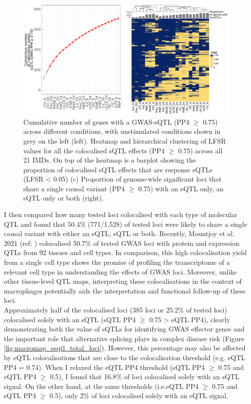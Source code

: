\begin{figure}[H]
  \centering
  \includegraphics[width=\textwidth]{coloc_cum_response_sqtl}
  \caption[Condition-specificity of colocalised sQTLs]{Cumulative number of genes with a GWAS-sQTL (PP4 $\geq$ 0.75) across different conditions, with unstimulated conditions shown in grey on the left (left). Heatmap and hierarchical clustering of LFSR values for all the colocalised sQTL effects (PP4 $\geq$ 0.75) across all 21 IMDs. On top of the heatmap is a barplot showing the proportion of colocalised sQTL effects that are response sQTLs (LFSR < 0.05) (c) Proportion of genome-wide significant loci that share a single causal variant (PP4 $\geq$ 0.75) with an eQTL only, an sQTL only or both (right).}
  \label{fig:coloc_cum_response_sqtl}   
\end{figure}
I then compared how many tested loci colocalised with each type of molecular QTL and found that 50.4\% (771/1,528) of tested loci were likely to share a single causal variant with either an eQTL, sQTL or both. Recently, Mountjoy et al. 2021 (ref: \cite{Mountjoy2021-fc}) colocalised 50.7\% of tested GWAS loci with protein and expression QTLs from 92 tissues and cell types. In comparison, this high colocalisation yield from a single cell type shows the promise of profiling the transcriptome of a relevant cell type in understanding the effects of GWAS loci. Moreover, unlike other tissue-level QTL maps, interpreting these colocalisations in the context of macrophages potentially aids the interpretation and functional follow-up of these loci. \\

Approximately half of the colocalised loci (385 loci or 25.2\% of tested loci) colocalised solely with an sQTL (sQTL PP4 $\geq$ 0.75 > eQTL PP4), clearly demonstrating both the value of sQTLs for identifying GWAS effector genes and the important role that alternative splicing plays in complex disease risk (Figure \ref{fig:macromap_esqtl_total_loci}). However, this percentage may also be affected by eQTL colocalisations that are close to the colocalisation threshold (e.g. eQTL PP4 = 0.74). When I relaxed the eQTL PP4 threshold (sQTL PP4 $\geq$ 0.75 and eQTL PP4 $\geq$ 0.5), I found that 16.8\% of loci colocalised solely with an sQTL signal.  On the other hand, at the same thresholds (i.e.eQTL PP4 $\geq$ 0.75 and sQTL PP4 $\geq$ 0.5), only 2\% of loci colocalised solely with an eQTL signal.\\

